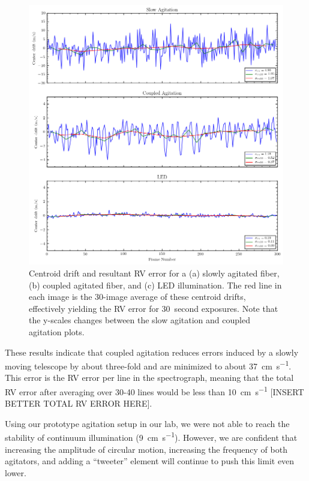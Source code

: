 \documentclass[twocolumn]{emulateapj}
\begin{document}
\begin{figure}
\centering
	\includegraphics[width=\textwidth]{images/rv_error.png}
	\caption{Centroid drift and resultant RV error for a (a) slowly agitated fiber, (b) coupled agitated fiber, and (c) LED illumination. The red line in each image is the 30-image average of these centroid drifts, effectively yielding the RV error for \SI{30}{second} exposures. Note that the y-scales changes between the slow agitation and coupled agitation plots.}
\label{fig:rv_error}
\end{figure}

These results indicate that coupled agitation reduces errors induced by a slowly moving telescope by about three-fold and are minimized to about \SI{37}{\centi\meter\per\second}. This error is the RV error per line in the spectrograph, meaning that the total RV error after averaging over 30-40 lines would be less than \SI{10}{\centi\meter\per\second} [INSERT BETTER TOTAL RV ERROR HERE].

Using our prototype agitation setup in our lab, we were not able to reach the stability of continuum illumination (\SI{9}{\centi\meter\per\second}). However, we are confident that increasing the amplitude of circular motion, increasing the frequency of both agitators, and adding a ``tweeter'' element will continue to push this limit even lower.
\end{document}
